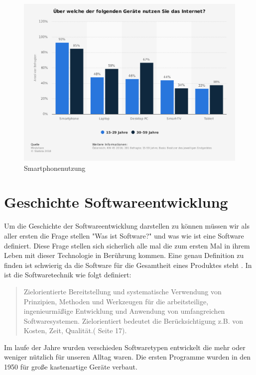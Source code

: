 \begin{figure}[h]
	\centering
	\includegraphics[width=14cm]{BilderAllgemein/SmartPhoneNutzung}\medskip
	\caption{Smartphonenutzung \cite{Geraetenutzung}}
	\label{fig:Smartphonenutzung}
\end{figure}







\section{Geschichte Softwareentwicklung}
Um die Geschichte der Softwareentwicklung darstellen zu können müssen wir als aller ersten die Frage stellen "Was ist Software?" und was wie ist eine Software definiert.
Diese Frage stellen sich sicherlich alle mal die zum ersten Mal in ihrem Leben mit dieser Technologie in Berührung kommen. Eine genau Definition zu finden ist schwierig da die Software für die Gesamtheit eines Produktes steht . In \cite{WasistSoftware} ist die Softwaretechnik wie folgt definiert:
\begin{quote}
\glqq Zielorientierte Bereitstellung und systematische Verwendung von Prinzipien, Methoden und Werkzeugen für
die arbeitsteilige, ingenieurmäßige Entwicklung und Anwendung
von umfangreichen Softwaresystemen. Zielorientiert bedeutet die
Berücksichtigung z.B. von Kosten, Zeit, Qualität.\grqq (\cite{WasistSoftware} Seite 17).
\end{quote}
Im laufe der Jahre wurden verschieden Softwaretypen entwickelt die mehr oder weniger nützlich für unseren Alltag waren. 
Die ersten Programme wurden in den 1950 für große kastenartige Geräte verbaut.


